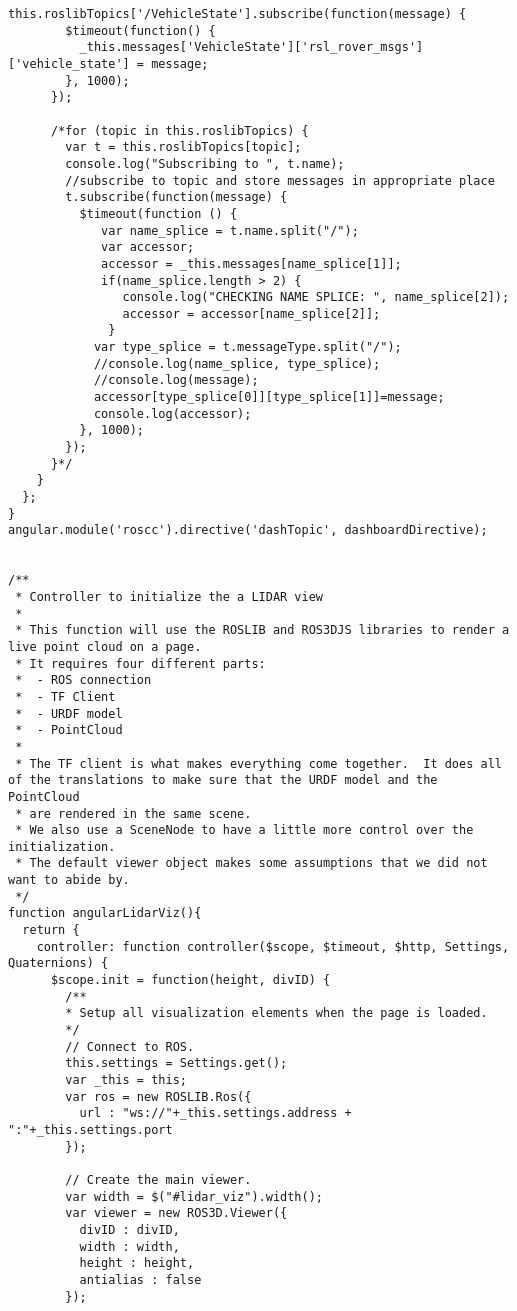 \begin{lstlisting}[breaklines=true,basicstyle=\tiny]
      this.roslibTopics['/VehicleState'].subscribe(function(message) {
        $timeout(function() {
          _this.messages['VehicleState']['rsl_rover_msgs']['vehicle_state'] = message;
        }, 1000);
      });

      /*for (topic in this.roslibTopics) {
        var t = this.roslibTopics[topic];
        console.log("Subscribing to ", t.name);
        //subscribe to topic and store messages in appropriate place
        t.subscribe(function(message) {
          $timeout(function () {
             var name_splice = t.name.split("/");
             var accessor;
             accessor = _this.messages[name_splice[1]];
             if(name_splice.length > 2) {
                console.log("CHECKING NAME SPLICE: ", name_splice[2]);
                accessor = accessor[name_splice[2]];
              }
            var type_splice = t.messageType.split("/");
            //console.log(name_splice, type_splice);
            //console.log(message);
            accessor[type_splice[0]][type_splice[1]]=message;
            console.log(accessor);
          }, 1000);
        });
      }*/
    }
  };
}
angular.module('roscc').directive('dashTopic', dashboardDirective);


/**
 * Controller to initialize the a LIDAR view
 *
 * This function will use the ROSLIB and ROS3DJS libraries to render a live point cloud on a page.
 * It requires four different parts:
 *  - ROS connection
 *  - TF Client
 *  - URDF model
 *  - PointCloud
 *
 * The TF client is what makes everything come together.  It does all of the translations to make sure that the URDF model and the PointCloud 
 * are rendered in the same scene.
 * We also use a SceneNode to have a little more control over the initialization.
 * The default viewer object makes some assumptions that we did not want to abide by.
 */
function angularLidarViz(){
  return {
    controller: function controller($scope, $timeout, $http, Settings, Quaternions) {
      $scope.init = function(height, divID) {
        /**
        * Setup all visualization elements when the page is loaded.
        */
        // Connect to ROS.
        this.settings = Settings.get();
        var _this = this;
        var ros = new ROSLIB.Ros({
          url : "ws://"+_this.settings.address + ":"+_this.settings.port
        });

        // Create the main viewer.
        var width = $("#lidar_viz").width();
        var viewer = new ROS3D.Viewer({
          divID : divID,
          width : width,
          height : height,
          antialias : false
        });


\end{lstlisting}
